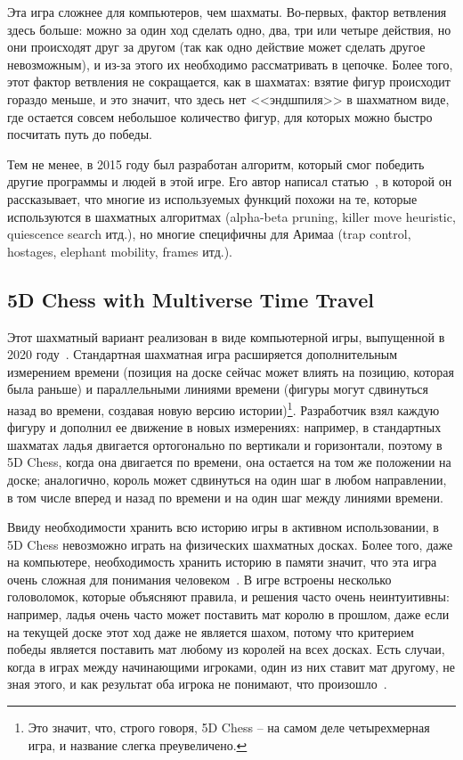 \documentclass{article}
\begin{document}
Эта игра сложнее для компьютеров, чем шахматы.
Во-первых, фактор ветвления здесь больше:
можно за один ход сделать одно, два, три или четыре действия,
но они происходят друг за другом (так как одно действие может сделать другое невозможным),
и из-за этого их необходимо рассматривать в цепочке.
Более того, этот фактор ветвления не сокращается, как в шахматах:
взятие фигур происходит гораздо меньше,
и это значит, что здесь нет <<эндшпиля>> в шахматном виде,
где остается совсем небольшое количество фигур,
для которых можно быстро посчитать путь до победы.

Тем не менее, в 2015 году был разработан алгоритм, который смог победить другие программы
и людей в этой игре. Его автор написал статью~\cite{arimaa-program}, в которой
он рассказывает, что многие из используемых функций похожи на те,
которые используются в шахматных алгоритмах (alpha-beta pruning, killer move heuristic, quiescence search итд.),
но многие специфичны для Аримаа (trap control, hostages, elephant mobility, frames итд.).

\subsection{5D Chess with Multiverse Time Travel}

Этот шахматный вариант реализован в виде компьютерной игры, выпущенной в 2020 году~\cite{5dchess-steam}.
Стандартная шахматная игра расширяется дополнительным измерением времени (позиция на доске сейчас может влиять на позицию, которая была раньше)
и параллельными линиями времени (фигуры могут сдвинуться назад во времени, создавая новую версию истории)\footnote{
    Это значит, что, строго говоря, 5D Chess -- на самом деле четырехмерная игра,
    и название слегка преувеличено.
}.
Разработчик взял каждую фигуру и дополнил ее движение в новых измерениях: 
например, в стандартных шахматах ладья двигается ортогонально по вертикали и горизонтали,
поэтому в 5D Chess, когда она двигается по времени, она остается на том же положении на доске;
аналогично, король может сдвинуться на один шаг в любом направлении, в том числе вперед и назад по времени
и на один шаг между линиями времени.

Ввиду необходимости хранить всю историю игры в активном использовании,
в 5D Chess невозможно играть на физических шахматных досках.
Более того, даже на компьютере, необходимость хранить историю в памяти
значит, что эта игра очень сложная для понимания человеком~\cite{5dchess-review}.
В игре встроены несколько головоломок, которые объясняют правила,
и решения часто очень неинтуитивны:
например, ладья очень часто может поставить мат королю в прошлом,
даже если на текущей доске этот ход даже не является шахом,
потому что критерием победы является поставить мат любому из королей на всех досках.
Есть случаи, когда в играх между начинающими игроками,
один из них ставит мат другому, не зная этого,
и как результат оба игрока не понимают, что произошло~\cite{5dchess-rtgame}.
\end{document}
